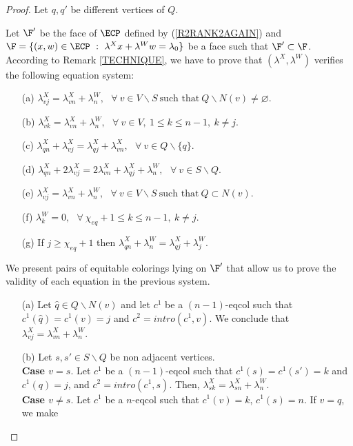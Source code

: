 \begin{proof}
Let $q, q'$ be different vertices of $Q$.

Let $\F'$ be the face of $\ECP$ defined by (\ref{R2RANK2AGAIN}) and
$\F = \{ (x,w) \in \ECP ~:~ \lambda^X x + \lambda^W w = \lambda_0\}$ be a face such that $\F' \subset \F$.
According to Remark \ref{TECHNIQUE}, we have to prove that $(\lambda^X, \lambda^W)$ verifies the following equation system: 
\begin{enumerate}
\item[(a)] $\lambda^X_{vj} = \lambda^X_{vn} + \lambda^W_n,~~~
	      \forall~ v \in V \backslash S ~\textrm{such that}~ Q \backslash N(v) \neq \varnothing$.
\item[(b)] $\lambda^X_{vk} = \lambda^X_{vn} + \lambda^W_n,~~~
	      \forall~ v \in V,~ 1 \leq k \leq n-1,~ k \neq j$.
\item[(c)] $\lambda^X_{qn} + \lambda^X_{vj} = \lambda^X_{qj} + \lambda^X_{vn},~~~
	      \forall~ v \in Q \backslash \{q\}$.
\item[(d)] $\lambda^X_{qn} + 2\lambda^X_{vj} = 2\lambda^X_{vn} + \lambda^X_{qj} + \lambda^W_n,~~~
	      \forall~ v \in S \backslash Q$.
\item[(e)] $\lambda^X_{vj} = \lambda^X_{vn} + \lambda^W_n,~~~
	      \forall~ v \in V \backslash S ~\textrm{such that}~ Q \subset N(v)$.
\item[(f)] $\lambda^W_k = 0,~~~ \forall~ \chi_{eq} + 1 \leq k \leq n-1,~ k \neq j$.
\item[(g)] If $j \geq \chi_{eq} + 1$ then
           $\lambda^X_{qn} + \lambda^W_n = \lambda^X_{qj} + \lambda^W_j$.
\end{enumerate}
We present pairs of equitable colorings lying on $\F'$ that allow us to
prove the validity of each equation in the previous system.
\begin{enumerate}
\item[(a)] Let $\hat{q} \in Q \backslash N(v)$ and let $c^1$ be a $(n-1)$-eqcol such that
$c^1(\hat{q}) = c^1(v) = j$ and $c^2 = intro(c^1,v)$.
We conclude that $\lambda^X_{vj} = \lambda^X_{vn} + \lambda^W_n$.
\item[(b)] Let $s, s' \in S \backslash Q$ be non adjacent vertices.\\
\textbf{Case $v = s$}. Let $c^1$ be a $(n-1)$-eqcol such that $c^1(s) = c^1(s') = k$ and $c^1(q) = j$,
and $c^2 = intro(c^1,s)$. Then, $\lambda^X_{sk} = \lambda^X_{sn} + \lambda^W_n$.\\
\textbf{Case $v \neq s$}. Let $c^1$ be a $n$-eqcol such that $c^1(v) = k$, $c^1(s) = n$. If $v = q$, we make

\end{enumerate}
\end{proof}
